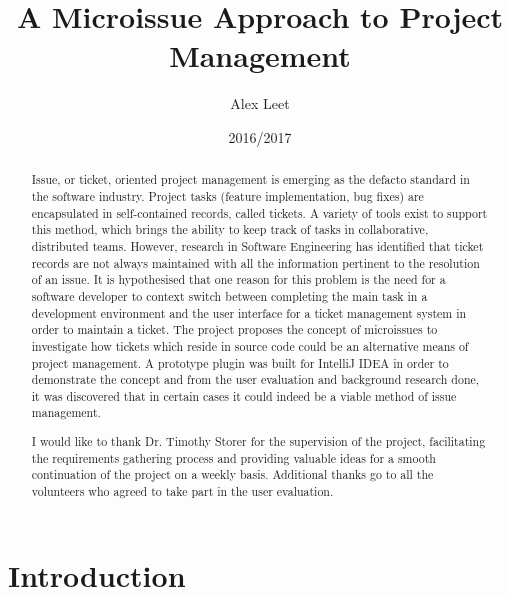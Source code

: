 \documentclass{4thYearProject}
\begin{document}
\title{A Microissue Approach to Project Management}
\author{Alex Leet}
\date{2016/2017}
\maketitle

\begin{abstract}
Issue, or ticket, oriented project management is emerging as the defacto standard in the software industry.  Project tasks (feature implementation, bug fixes) are encapsulated in self-contained records, called tickets.  A variety of tools exist to support this method, which brings the ability to keep track of tasks in collaborative, distributed teams. However,  research in Software Engineering has identified that ticket records are not always maintained with all the information pertinent to the resolution of an issue.  It is hypothesised that one reason for this problem is the need for a software developer to context switch between completing the main task in a development environment and the user interface for a ticket management system in order to maintain a ticket.  The project proposes the concept of microissues to investigate how tickets which reside in source code could be an alternative means of project management. A prototype plugin was built for IntelliJ IDEA in order to demonstrate the concept and from the user evaluation and background research done, it was discovered that in certain cases it could indeed be a viable method of issue management.

\end{abstract}

\pagebreak
\renewcommand{\abstractname}{Acknowledgements}
\begin{abstract}

I would like to thank Dr. Timothy Storer for the supervision of the project, facilitating the requirements gathering process and providing valuable ideas for a smooth continuation of the project on a weekly basis. Additional thanks go to all the volunteers who agreed to take part in the user evaluation.

\end{abstract}
\educationalconsent

\tableofcontents

\chapter{Introduction}
\end{document}
